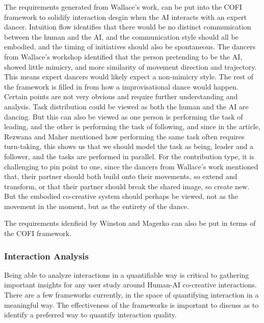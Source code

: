 \documentclass[final,5p,times,twocolumn,authoryear]{article}
\begin{document}
The requirements generated from Wallace's work, can be put into the COFI
framework to solidify interaction desgin when the AI interacts with an
expert dancer. Intuition flow identifies that there would be no distinct
communication between the human and the AI, and the communication style
should all be embodied, and the timing of initiatives should also be
spontaneous. The dancers from Wallace's workshop identified that the
person pretending to be the AI, showed little mimicry, and more
similarity of movement direction and trajectory. This means expert
dancers would likely expect a non-mimicry style. The rest of the
framework is filled in from how a improvisational dance would happen.
Certain points are not very obvious and require further understanding
and analysis. Task distribution could be viewed as both the human and
the AI are dancing. But this can also be viewed as one person is
performing the task of leading, and the other is performing the task of
following, and since in the article, Rezwana and Maher mentioned how
performing the same task often requires turn-taking, this shows us that
we should model the task as being, leader and a follower, and the tasks
are performed in parallel. For the contribution type, it is challenging
to pin point to one, since the dancers from Wallace's work mentioned
that, their partner should both build onto their movements, so extend
and transform, or that their partner should break the shared image, so
create new. But the embodied co-creative system should perhaps be
viewed, not as the movement in the moment, but as the entirety of the dance.

The requirements idenfieid by Winston and Magerko can also be put in
terms of the COFI framework. 

\subsubsection{Interaction Analysis}

Being able to analyze interactions in a quantifiable way is critical to
gathering important insights for any user study around Human-AI
co-creative interactions. There are a few frameworks currently, in the
space of quantifying interaction in a meaningful way. The effectiveness
of the frameworks is important to discuss as to identify a preferred way
to quantify interaction quality.



\end{document}
